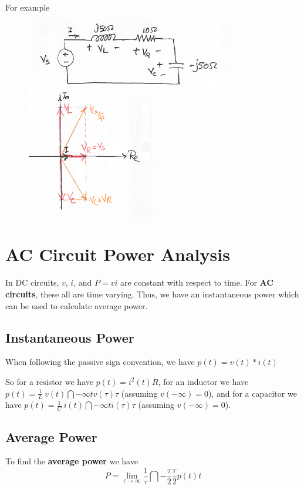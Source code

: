 \documentclass[12pt]{article}
\begin{document}
For example
\begin{figure}[ht]
\centering
\includegraphics[width=0.8\textwidth]{samplecircuit.png}
\includegraphics[width=0.5\textwidth]{samplecircuitsolved.png}
\end{figure}

\section*{AC Circuit Power Analysis}
In DC circuits, $v$, $i$, and $P = vi$ are constant with respect to time. For {\bf AC circuits}, these all are time varying. Thus, we have an instantaneous power which can be used to calculate average power.

\subsection*{Instantaneous Power}
When following the passive sign convention, we have $p(t) = v(t) * i(t)$

So for a resistor we have $p(t) = i^2(t)R$, for an inductor we have $p(t) = \frac{1}{L}\ v(t)\dint{-\infty}{t}{v(\tau)}{\tau}$ (assuming $v(-\infty) = 0$), and for a capacitor we have $p(t) = \frac{1}{C}\ i(t)\dint{-\infty}{t}{i(\tau)}{\tau}$ (assuming $v(-\infty) = 0$).

\subsection*{Average Power}
To find the {\bf average power} we have \[ P = \lim_{\tau\to\infty} \frac{1}{\tau} \dint{-\frac{\tau}{2}}{\frac{\tau}{2}}{p(t)}{t} \]
\end{document}
